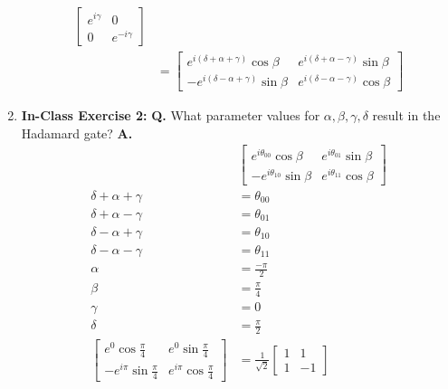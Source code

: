 \documentclass[main.tex]{subfiles}
\begin{document}
\begin{enumerate}
\begin{align*}
                                            \left[\begin{array}{cc}e^{i\gamma}&0\\0&e^{-i\gamma}\end{array}\right]\\    
                                            & = \left[\begin{array}{cc}
                                            e^{i(\delta+\alpha+\gamma)} \cos \beta & e^{i(\delta+\alpha-\gamma)} \sin \beta \\
                                            -e^{i(\delta-\alpha+\gamma)} \sin \beta & e^{i(\delta-\alpha-\gamma)} \cos \beta
                                            \end{array}\right]
\end{align*}
   

\item[] \textbf{In-Class Exercise 2:} \textbf{Q.} What parameter values for $\alpha, \beta, \gamma, \delta$ result in the Hadamard gate? \textbf{A.}
\begin{align*}
                                    & \left[\begin{array}{ll}e^{i \theta_{00}} \cos \beta & e^{i \theta_{01}} \sin \beta \\
                                    -e^{i \theta_{10}} \sin \beta & e^{i \theta_{11}} \cos \beta\end{array}\right]\\
    \delta+\alpha+\gamma            & = \theta_{00} \\
    \delta+\alpha-\gamma            & = \theta_{01} \\
    \delta-\alpha+\gamma            & = \theta_{10} \\
    \delta-\alpha-\gamma            & = \theta_{11} \\
    \alpha                          & = \frac{-\pi}{2}\\
    \beta                           & = \frac{\pi}{4}\\
    \gamma                          & = 0\\
    \delta                          & = \frac{\pi}{2}\\
    \left[\begin{array}{ll}
    e^{0}\cos\frac{\pi}{4}&
    e^{0}\sin\frac{\pi}{4}\\
    -e^{i\pi}\sin\frac{\pi}{4}&
    e^{i\pi}\cos\frac{\pi}{4}
    \end{array}\right]              & = \frac{1}{\sqrt{2}}\left[\begin{array}{ll}1&1\\1&-1\end{array}\right]
\end{align*}


\end{enumerate}
\end{document}
